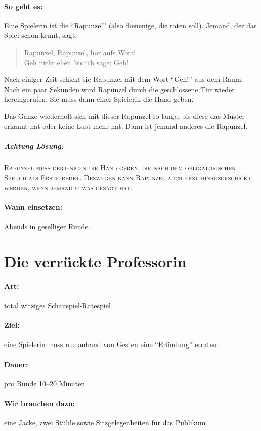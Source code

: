 \paragraph{So geht es:} Eine Spielerin ist die "`Rapunzel"' (also dienenige, die raten soll). Jemand, der das Spiel schon kennt, sagt:
  \begin{quote}
    Rapunzel, Rapunzel, hör aufs Wort!\\
    Geh nicht eher, bis ich sage: Geh!
  \end{quote}
Nach einiger Zeit schickt sie Rapunzel mit dem Wort "`Geh!"' aus dem Raum. Nach ein paar Sekunden wird Rapunzel durch die geschlossene Tür wieder hereingerufen. Sie muss dann einer Spielerin die Hand geben.

Das Ganze wiederholt sich mit dieser Rapunzel so lange, bis diese das Muster erkannt hat oder keine Lust mehr hat. Dann ist jemand anderes die Rapunzel.

\subparagraph{Achtung Lösung:} \textsc{Rapunzel muss derjenigen die Hand geben, die nach dem obligatorischen Spruch als Erste redet. Deswegen kann Rapunzel auch erst hinausgeschickt werden, wenn jemand etwas gesagt hat.}
\paragraph{Wann einsetzen:} Abends in geselliger Runde.

\section{Die verrückte Professorin}
\paragraph{Art:} total witziges Schauspiel-Ratespiel
\paragraph{Ziel:} eine Spielerin muss nur anhand von Gesten eine "`Erfindung"' erraten 
\paragraph{Dauer:} pro Runde 10--20 Minuten
\paragraph{Wir brauchen dazu:} eine Jacke, zwei Stühle sowie Sitzgelegenheiten für das Publikum
